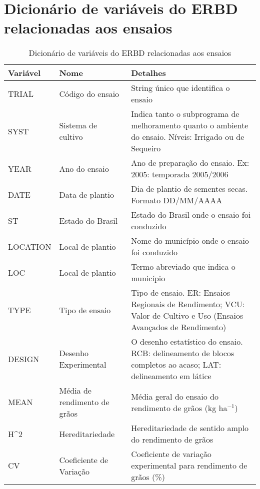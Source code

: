 


\section{Dicionário de variáveis do ERBD relacionadas aos ensaios}\label{sec: dicionario-erbd1}

\begin{longtable}{@{} p{4cm} p{4cm} p{8cm} @{}} 
	\caption{Dicionário de variáveis do ERBD relacionadas aos ensaios}
	\toprule
	\textbf{Variável} & \textbf{Nome}                    & \textbf{Detalhes}                                                           \\* \midrule
	\endfirsthead
	\endhead
	\bottomrule
	\endfoot
	\endlastfoot
	TRIAL                & Código do ensaio        & String único que identifica o ensaio                               \\
	SYST   & Sistema de cultivo           & Indica tanto o subprograma de melhoramento quanto o ambiente do ensaio. Níveis: Irrigado ou de Sequeiro            \\
	YEAR                 & Ano do ensaio           & Ano de preparação do ensaio. Ex: 2005: temporada 2005/2006         \\
	DATE                 & Data de plantio         & Dia de plantio de sementes secas. Formato DD/MM/AAAA               \\
	ST                   & Estado do Brasil        & Estado do Brasil onde o ensaio foi conduzido                       \\
	LOCATION             & Local de plantio        & Nome do município onde o ensaio foi conduzido                      \\
	LOC                  & Local de plantio        & Termo abreviado que indica o município                             \\
	TYPE   & Tipo de ensaio               & Tipo de ensaio. ER: Ensaios Regionais de Rendimento; VCU: Valor de Cultivo e Uso (Ensaios Avançados de Rendimento) \\
	DESIGN & Desenho Experimental         & O desenho estatístico do ensaio. RCB: delineamento de blocos completos ao acaso; LAT: delineamento em látice       \\
	MEAN   & Média de rendimento de grãos & Média geral do ensaio do rendimento de grãos (kg ha$^{-1}$)                                       \\
	H\textasciicircum{}2 & Hereditariedade         & Hereditariedade de sentido amplo do rendimento de grãos            \\
	CV                   & Coeficiente de Variação & Coeficiente de variação experimental para rendimento de grãos (\%) \\* \bottomrule
\end{longtable}